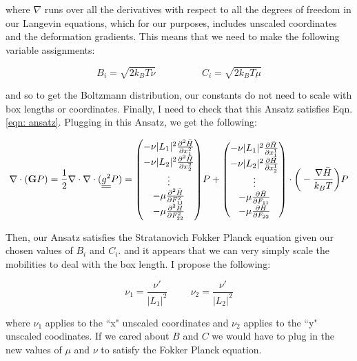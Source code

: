 \documentclass[12pt]{article}
\begin{document}
where $\nabla$ runs over all the derivatives with respect to all the degrees of freedom in our Langevin equations, which for our purposes, includes unscaled coordinates and the deformation gradients. This means that we need to make the following variable assignments:
\begin{center}
\begin{equation}
B_i = \sqrt{2 k_B T \nu} \hspace{2cm} C_i = \sqrt{2 k_B T \mu}
\end{equation}
\end{center}
and so to get the Boltzmann distribution, our constants do not need to scale with box lengths or coordinates. Finally, I need to check that this Ansatz satisfies Eqn. \ref{eqn: ansatz}. Plugging in this Ansatz, we get the following:
\begin{center}
\begin{equation}
\label{eqn: plugin}
\nabla \cdot (\vb{G} P) = \frac{1}{2} \nabla\cdot \nabla \cdot (\underline{\underline{g^2}}P ) = \mqty( -\nu |L_1|^2 \pdv[2]{\bar{H}}{x_1}\\ -\nu |L_2|^2 \pdv[2]{\bar{H}}{x_2}\\ \vdots\\ -\mu \pdv[2]{\bar{H}}{F_{11}}\\ -\mu \pdv[2]{\bar{H}}{F_{22}})P + \mqty( -\nu |L_1|^2 \pdv{\bar{H}}{x_1^1}\\ -\nu |L_2|^2 \pdv{\bar{H}}{x_2^1}\\ \vdots\\ -\mu \pdv{\bar{H}}{F_{11}}\\ -\mu \pdv{\bar{H}}{F_{22}})\cdot \bigg(- \frac{\nabla \bar{H}}{k_B T}\bigg)P
\end{equation}
\end{center}
Then, our Ansatz satisfies the Stratanovich Fokker Planck equation given our chosen values of $B_i$ and $C_i$. and it appears that we can very simply scale the mobilities to deal with the box length. I propose the following:
\begin{center}
\begin{equation}
\nu_1 = \frac{\nu'}{|L_1|^2} \hspace{1cm} \nu_2 =  \frac{\nu'}{|L_2|^2}
\end{equation}
\end{center}
where $\nu_1$ applies to the ``x" unscaled coordinates and $\nu_2$ applies to the ``y" unscaled coodinates. If we cared about $B$ and $C$ we would have to plug in the new values of $\mu$ and $\nu$ to satisfy the Fokker Planck equation.
\end{document}
